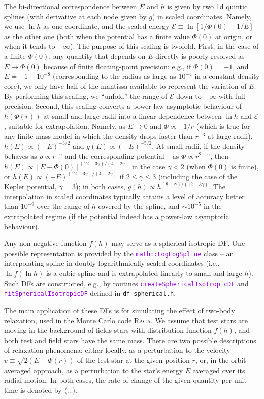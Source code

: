 \documentclass[12pt]{article}
\newcommand{\Raga} {\textsc{Raga}\xspace}
\newcommand{\ttt}[1]{\textcolor{darkviolet}{\texttt{#1}}}
\newcommand{\scE}{\mathscr E}
\begin{document}
The bi-directional correspondence between $E$ and $h$ is given by two 1d quintic splines (with derivative at each node given by $g$) in scaled coordinates. Namely, we use $\ln h$ as one coordinate, and the scaled energy $\scE \equiv \ln[1/\Phi(0) - 1/E]$ as the other one (both when the potential has a finite value $\Phi(0)$ at origin, or when it tends to $-\infty$). The purpose of this scaling is twofold. First, in the case of a finite $\Phi(0)$, any quantity that depends on $E$ directly is poorly resolved as $E\to \Phi(0)$ because of finite floating-point precision: e.g., if $\Phi(0)=-1$, and $E=-1+10^{-8}$ (corresponding to the radius as large as $10^{-4}$ in a constant-density core), we only have half of the mantissa available to represent the variation of $E$. By performing this scaling, we ``unfold'' the range of $\scE$ down to $-\infty$ with full precision. Second, this scaling converts a power-law asymptotic behaviour of $h(\Phi(r))$ at small and large radii into a linear dependence between $\ln h$ and $\scE$, suitable for extrapolation. Namely, as $E \to 0$ and $\Phi \propto -1/r$ (which is true for any finite-mass model in which the density drops faster than $r^{-3}$ at large radii), $h(E)\propto (-E)^{-3/2}$ and $g(E)\propto (-E)^{-5/2}$. At small radii, if the density behaves as $\rho \propto r^{-\gamma}$ and the corresponding potential -- as $\Phi \propto r^{2-\gamma}$, then $h(E) \propto [E-\Phi(0)]^{(12-3\gamma)/(4-2\gamma)}$ in the case $\gamma<2$ (when $\Phi(0)$ is finite), or $h(E) \propto (-E)^{(12-3\gamma)/(4-2\gamma)}$ if $2\le \gamma \le 3$ (including the case of the Kepler potential, $\gamma=3$); in both cases, $g(h) \propto h^{(8-\gamma)/(12-3\gamma)}$.
The interpolation in scaled coordinates typically attains a level of accuracy better than $10^{-9}$ over the range of $h$ covered by the spline, and $\sim 10^{-5}$ in the extrapolated regime (if the potential indeed has a power-law asymptotic behaviour).

Any non-negative function $f(h)$ may serve as a spherical isotropic DF. One possible representation is provided by the \ttt{math::LogLogSpline} class -- an interpolating spline in doubly-logarithmically scaled coordinates (i.e., $\ln f (\ln h)$ is a cubic spline and is extrapolated linearly to small and large $h$). Such DFs are constructed, e.g., by routines \ttt{createSphericalIsotropicDF} and \ttt{fitSphericalIsotropicDF} defined in \texttt{df_spherical.h}.

The main application of these DFs is for simulating the effect of two-body relaxation, used in the Monte Carlo code \Raga \cite{Vasiliev2015}. We assume that test stars are moving in the background of fields stars with distribution function $f(h)$, and both test and field stars have the same mass. There are two possible descriptions of relaxation phenomena: either locally, as a perturbation to the velocity $v\equiv \sqrt{2(E-\Phi(r))}$ of the test star at the given position $r$, or, in the orbit-averaged approach, as a perturbation to the star's energy $E$ averaged over its radial motion.
In both cases, the rate of change of the given quantity per unit time is denoted by $\langle \dots \rangle$.
\end{document}
